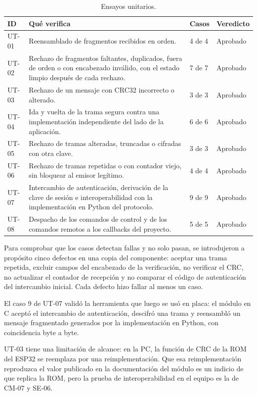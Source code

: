\begin{table}[htbp]
\centering
\caption{Ensayos unitarios.}
\label{tab:ensayos_ut}
\small
\begin{tabular}{L{0.09\textwidth} L{0.57\textwidth} L{0.08\textwidth} L{0.13\textwidth}}
\toprule
\textbf{ID} & \textbf{Qué verifica} & \textbf{Casos} & \textbf{Veredicto} \\
\midrule
UT-01 & Reensamblado de fragmentos recibidos en orden. & 4 de 4 & Aprobado \\
UT-02 & Rechazo de fragmentos faltantes, duplicados, fuera de orden o con encabezado inválido, con el estado limpio después de cada rechazo. & 7 de 7 & Aprobado \\
UT-03 & Rechazo de un mensaje con CRC32 incorrecto o alterado. & 3 de 3 & Aprobado \\
UT-04 & Ida y vuelta de la trama segura contra una implementación independiente del lado de la aplicación. & 6 de 6 & Aprobado \\
UT-05 & Rechazo de tramas alteradas, truncadas o cifradas con otra clave. & 3 de 3 & Aprobado \\
UT-06 & Rechazo de tramas repetidas o con contador viejo, sin bloquear al emisor legítimo. & 4 de 4 & Aprobado \\
UT-07 & Intercambio de autenticación, derivación de la clave de sesión e interoperabilidad con la implementación en Python del protocolo. & 9 de 9 & Aprobado \\
UT-08 & Despacho de los comandos de control y de los comandos remotos a los callbacks del proyecto. & 5 de 5 & Aprobado \\
\bottomrule
\end{tabular}
\end{table}

Para comprobar que los casos detectan fallas y no solo pasan, se introdujeron a propósito cinco defectos en una copia del componente: aceptar una trama repetida, excluir campos del encabezado de la verificación, no verificar el CRC, no actualizar el contador de recepción y no comparar el código de autenticación del intercambio inicial. Cada defecto hizo fallar al menos un caso.

El caso 9 de UT-07 validó la herramienta que luego se usó en placa: el módulo en C aceptó el intercambio de autenticación, descifró una trama y reensambló un mensaje fragmentado generados por la implementación en Python, con coincidencia byte a byte.

UT-03 tiene una limitación de alcance: en la PC, la función de CRC de la ROM del ESP32 se reemplaza por una reimplementación. Que esa reimplementación reproduzca el valor publicado en la documentación del módulo es un indicio de que replica la ROM, pero la prueba de interoperabilidad en el equipo es la de CM-07 y SE-06.

